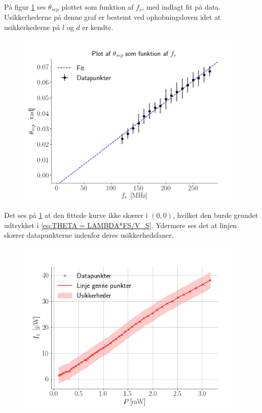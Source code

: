 \documentclass[main]{subfiles}
\begin{document}
På figur \cref{fig:graf1} ses $\theta_{sep}$ plottet som funktion af $f_s$, med indlagt fit på data. Usikkerhederne på denne graf er bestemt ved ophobningsloven idet at usikkerhederne på $l$ og $d$ er kendte.
\begin{figure}[H]
    \centering
    \includegraphics[width=\linewidth]{tegninger/graf1.png}
    \caption{}
    \label{fig:graf1}
\end{figure}
Det ses på \cref{fig:graf1} at den fittede kurve ikke skærer i $(0,0)$, hvilket den burde grundet udtrykket i \cref{eq:THETA = LAMBDA*FS/V_S}.%
Ydermere ses det at linjen skærer datapunkterne indenfor deres usikkerhedsfaner.

\begin{figure}[H]
    \centering
    \includegraphics[width=\linewidth]{tegninger/graf2.png}
    \caption{}
    \label{fig:graf2}
\end{figure}
\end{document}
